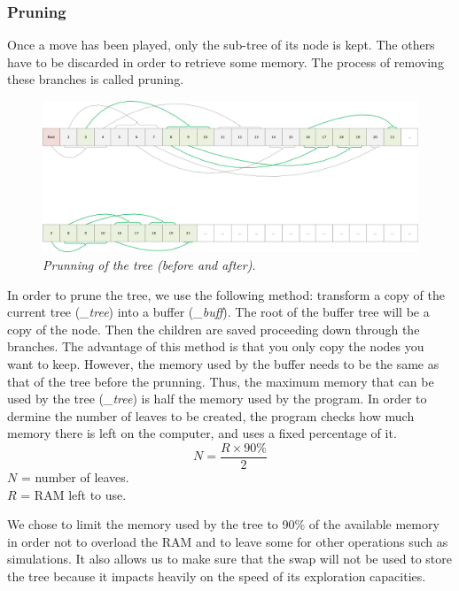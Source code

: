 \subsubsection{Pruning}
Once a move has been played, only the sub-tree of its node is kept. The others have to be discarded in order to retrieve some memory. The process of removing these branches is called pruning.
\begin{figure}[H] 
\centerline{\includegraphics[width=\textwidth]{Data_Structure/Img/array.png}}
\caption{\label{fig:arrayprunning}\textit{Prunning of the tree (before and after)}.}
\end{figure}
In order to prune the tree, we use the following method: transform a copy of the current tree (\textit{\_tree}) into a buffer (\textit{\_buff}). The root of the buffer tree will be a copy of the node. Then the children are saved proceeding down through the branches. The advantage of this method is that you only copy the nodes you want to keep. However, the memory used by the buffer needs to be the same as that of the tree before the prunning. Thus, the maximum memory that can be used by the tree (\textit{\_tree}) is half the memory used by the program. In order to dermine the number of leaves to be created, the program checks how much memory there is left on the computer, and uses a fixed percentage of it.
\begin{equation}
N = \frac{R \times 90\%}{2}
\end{equation}
\ensuremath{N} = number of leaves.\\
\ensuremath{R} = RAM left to use.

We chose to limit the memory used by the tree to 90\% of the available memory in order not to overload the RAM and to leave some for other operations such as simulations. It also allows us to make sure that the swap will not be used to store the tree because it impacts heavily on the speed of its exploration capacities.
\newpage
